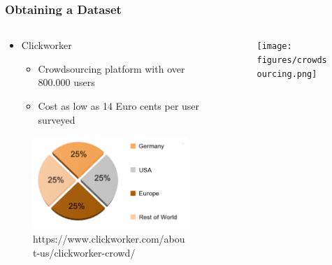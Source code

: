 \begin{frame}
	\frametitle{Obtaining a Dataset}
	\begin{columns}
		\begin{column}{0.5\textwidth}
			\begin{itemize}
				\item Clickworker
				\begin{itemize}
					\item Crowdsourcing platform with over 800.000 users
					\item Cost as low as 14 Euro cents per user surveyed
				\end{itemize}
			\end{itemize}
			\begin{figure}
				\centering
				\includegraphics[scale=0.3]{figures/clickworker_users.png}
				\caption{https://www.clickworker.com/about-us/clickworker-crowd/}
			\end{figure}
		\end{column}
		\begin{column}{0.5\textwidth}
			\begin{figure}
				\centering
				\texttt{[image: figures/crowdsourcing.png]}
			\end{figure}
		\end{column}
	\end{columns}
\end{frame}

